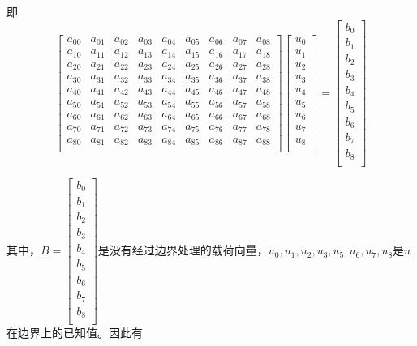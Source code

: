 \documentclass[12pt,a4paper]{article}
\begin{document}
即$$
\begin{bmatrix}
a_{00} & a_{01} & a_{02} & a_{03} & a_{04} & a_{05} & a_{06} & a_{07} & a_{08}\\
a_{10} & a_{11} & a_{12} & a_{13} & a_{14} & a_{15} & a_{16} & a_{17} & a_{18}\\
a_{20} & a_{21} & a_{22} & a_{23} & a_{24} & a_{25} & a_{26} & a_{27} & a_{28}\\
a_{30} & a_{31} & a_{32} & a_{33} & a_{34} & a_{35} & a_{36} & a_{37} & a_{38}\\
a_{40} & a_{41} & a_{42} & a_{43} & a_{44} & a_{45} & a_{46} & a_{47} & a_{48}\\
a_{50} & a_{51} & a_{52} & a_{53} & a_{54} & a_{55} & a_{56} & a_{57} & a_{58}\\
a_{60} & a_{61} & a_{62} & a_{63} & a_{64} & a_{65} & a_{66} & a_{67} & a_{68}\\
a_{70} & a_{71} & a_{72} & a_{73} & a_{74} & a_{75} & a_{76} & a_{77} & a_{78}\\
a_{80} & a_{81} & a_{82} & a_{83} & a_{84} & a_{85} & a_{86} & a_{87} & a_{88}\\
\end{bmatrix}
\begin{bmatrix}
u_{0} \\
u_{1} \\
u_{2} \\
u_{3} \\
u_{4} \\
u_{5} \\
u_{6} \\
u_{7} \\
u_{8} \\
\end{bmatrix}=
\begin{bmatrix}
b_{0} \\
b_{1} \\
b_{2} \\
b_{3} \\
b_{4} \\
b_{5} \\
b_{6} \\
b_{7} \\
b_{8} \\
\end{bmatrix}$$

其中，$B=\begin{bmatrix}
b_{0} \\
b_{1} \\
b_{2} \\
b_{3} \\
b_{4} \\
b_{5} \\
b_{6} \\
b_{7} \\
b_{8} \\
\end{bmatrix}$是没有经过边界处理的载荷向量，$u_0,u_1,u_2,u_3,u_5,u_6,u_7,u_8$是$u$在边界上的已知值。因此有
\end{document}
